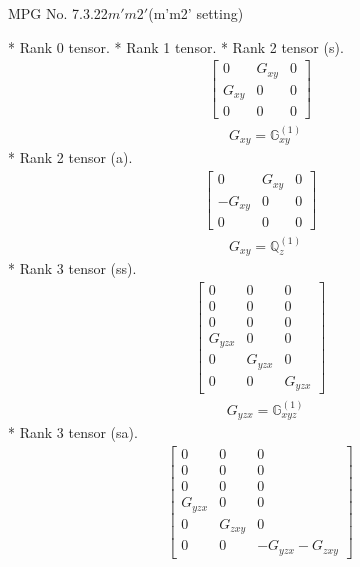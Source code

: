\documentclass[fleqn,8pt,landscape]{jsarticle}
\begin{document}
\setcounter{MaxMatrixCols}{32}

\renewcommand{\tablename}{Table~}
\renewcommand{\figurename}{Figure~}
\begin{center}
\LARGE
MPG No. 7.3.22\quad$m'm2'$\quad(m'm2' setting)
\end{center}
* Rank 0 tensor.
* Rank 1 tensor.
* Rank 2 tensor (s).
\begin{align*}
\begin{bmatrix} 0 & G_{xy} & 0 \\ G_{xy} & 0 & 0 \\ 0 & 0 & 0 \end{bmatrix}
\end{align*}
\begin{align*}
& G_{xy} = \mathbb{G}_{xy}^{(1)}
\end{align*}
* Rank 2 tensor (a).
\begin{align*}
\begin{bmatrix} 0 & G_{xy} & 0 \\ - G_{xy} & 0 & 0 \\ 0 & 0 & 0 \end{bmatrix}
\end{align*}
\begin{align*}
& G_{xy} = \mathbb{Q}_{z}^{(1)}
\end{align*}
* Rank 3 tensor (ss).
\begin{align*}
\begin{bmatrix} 0 & 0 & 0 \\ 0 & 0 & 0 \\ 0 & 0 & 0 \\ G_{yzx} & 0 & 0 \\ 0 & G_{yzx} & 0 \\ 0 & 0 & G_{yzx} \end{bmatrix}
\end{align*}
\begin{align*}
& G_{yzx} = \mathbb{G}_{xyz}^{(1)}
\end{align*}
* Rank 3 tensor (sa).
\begin{align*}
\begin{bmatrix} 0 & 0 & 0 \\ 0 & 0 & 0 \\ 0 & 0 & 0 \\ G_{yzx} & 0 & 0 \\ 0 & G_{zxy} & 0 \\ 0 & 0 & - G_{yzx} - G_{zxy} \end{bmatrix}
\end{align*}
\end{document}
